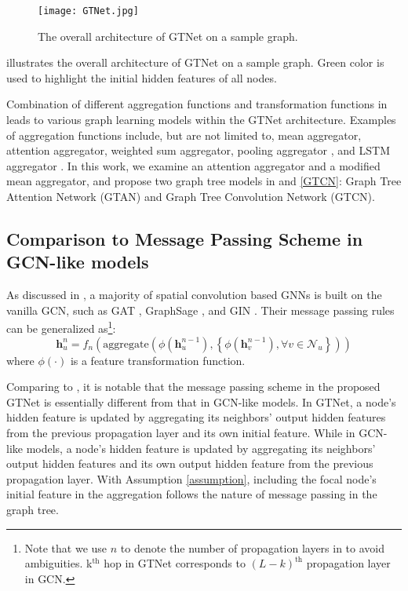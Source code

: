 \documentclass[lettersize,journal]{IEEEtran}
\theoremstyle{plain}
\theoremstyle{definition}
\theoremstyle{remark}
\begin{document}
\begin{figure}[h]
	\begin{center}
		\texttt{[image: GTNet.jpg]}
		\caption{The overall architecture of GTNet on a sample graph.}
		\label{fig:GTNet}
	\end{center}
\end{figure}

 illustrates the overall architecture of GTNet on a sample graph. Green color is used to highlight the initial hidden features of all nodes.

Combination of different aggregation functions and transformation functions in  leads to various graph learning models within the GTNet architecture. Examples of aggregation functions include, but are not limited to, mean aggregator, attention aggregator, weighted sum aggregator, pooling aggregator \cite{hamilton2017inductive}, and LSTM aggregator \cite{hamilton2017inductive}. In this work, we examine an attention aggregator and a modified mean aggregator, and propose two graph tree models in  and \ref{GTCN}: Graph Tree Attention Network (GTAN) and Graph Tree Convolution Network (GTCN).

\subsection{Comparison to Message Passing Scheme in GCN-like models}
\label{compare_rule}
As discussed in , a majority of spatial convolution based GNNs is built on the vanilla GCN, such as GAT \cite{DBLP:conf/iclr/VelickovicCCRLB18}, GraphSage \cite{hamilton2017inductive}, and GIN \cite{xu2018powerful}. Their message passing rules can be generalized as\footnote{Note that we use $n$ to denote the number of propagation layers in  to avoid ambiguities. k$^\text{th}$ hop in GTNet corresponds to $(L-k)^\text{th}$ propagation layer in GCN.}:
\begin{equation}
	\label{eqn:gcn_rule}
	\bm{h}_u^n = f_n \left(\text{aggregate}\left( \phi \left( \bm{h}_u^{n-1} \right), \left\{\phi \left(\bm{h}_v^{n-1} \right), \forall v \in \mathcal{N}_u \right\}\right)\right)
\end{equation}
where $\phi\left(\cdot\right)$ is a feature transformation function.

Comparing to , it is notable that the message passing scheme in the proposed GTNet is essentially different from that in GCN-like models. In GTNet, a node's hidden feature is updated by aggregating its neighbors' output hidden features from the previous propagation layer and its own initial feature. While in GCN-like models, a node's hidden feature is updated by aggregating its neighbors' output hidden features and its own output hidden feature from the previous propagation layer. With Assumption \ref{assumption}, including the focal node's initial feature in the aggregation follows the nature of message passing in the graph tree.
\end{document}
